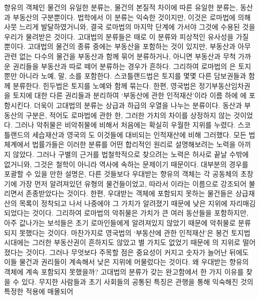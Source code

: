 향유의 객체인 물건의 유일한  분류는,
물건의 본질적 차이에 따른 유일한 분류는,
동산과 부동산의 구분뿐이다.
법학에서 이 분류는 익숙한 것이지만,
이것은 로마법에 의해 사뭇 느리게 발달하였거니와,
결국 로마법의 마지막 단계에 가서야 그것에 수용된 것을
우리가 물려받은 것이다.
고대법의 분류들은 때로 이 분류와 피상적인 유사성을 가질 뿐이다.
고대법의 물건의 종류 중에는 부동산을 포함하는 것이 있지만,
부동산과 아무 관련 없는 다수의 물건을
부동산과 함께
묶어 분류하거나,
아니면
부동산과 무척 가까운 권리들을 부동산과 따로 떼어 분류하는 경우가 흔하다.
그리하여
로마법의 은 토지뿐만 아니라 노예, 말, 소를 포함한다.
스코틀랜드법은 토지를 몇몇 다른 담보권들과 함께 분류한다.
힌두법은 토지를 노예와 함께 묶는다.
한편, 영국법은 정기부동산임차권을
토지에 대한 다른 권리들과 분리하여
`부동산에 관한 인적재산'이라 이름 하에
에 포함시킨다.
더욱이 고대법의 분류는 상급과 하급의 우열을 나누는 분류이다.
동산과 부동산의 구분은,
적어도 로마법에 관한 한,
그러한 가치의 차이를 상정하지 않는 것이었다.
그러나
악취물은 비악취물에 비해서 처음에는 확실히 우월한 지위를 누렸다.
스코틀랜드의 세습재산과
영국의 도 이것들에 대비되는 인적재산에 비해 그러했다.
모든 법체계에서 법률가들은
이러한 분류를 어떤 합리적인 원리로 설명해보려는
노력을 아끼지 않았다.
그러나 구별의 근거를 법철학적으로 찾으려는 노력은 허사로 끝날 수밖에
없거니와,
그것은 철학이 아니라 역사에 속하는 문제이기 때문이다.
대부분의 경우를 포괄할 수 있을 만한 설명은,
다른 것들보다 우대받는 향유의 객체는
각 공동체의 초창기에 가장 먼저 알려져있던 유형의 물건들이었고,
따라서 이라는 이름으로 강조되어
불리면서 존종받았다는 것이다.
한편, 우대받는 객체에 포함되지 못하는 물건들은
상급재산의 목록이 정착되고 나서 나중에야
그 가치가 알려졌기 때문에 낮은 지위에 자리매김되었다는 것이다.
그리하여 로마법의 악취물은 가치가 큰 여러 동산들을 포함하지만,
아주 값나가는 보석들은
초기 로마인들에게 알려져있지 않았기 때문에
악취물로 분류되지 못했다는 것이다.
마찬가지로 영국법의 `부동산에 관한 인적재산'은
봉건 토지법 시대에는 그러한 부동산권이 흔하지도 않았고
별 가치도 없었기 때문에 의 지위로 떨어졌다는 것이다.
그러나
무엇보다 주목할 점은
중요성이 커지고 숫자가 늘어난 뒤에도
이들 물건과 권리들이 계속해서 낮은 지위에 머물렀다는 것이다.
왜 우대받는 향유의 객체에 계속 포함되지 못했을까?
고대법의 분류가 갖는 완고함에서
한 가지 이유를
찾을 수 있다.
무지한 사람들과 초기 사회들의 공통된 특징은
관행을 통해 익숙해진 것의 특정한 적용에 매몰되어
